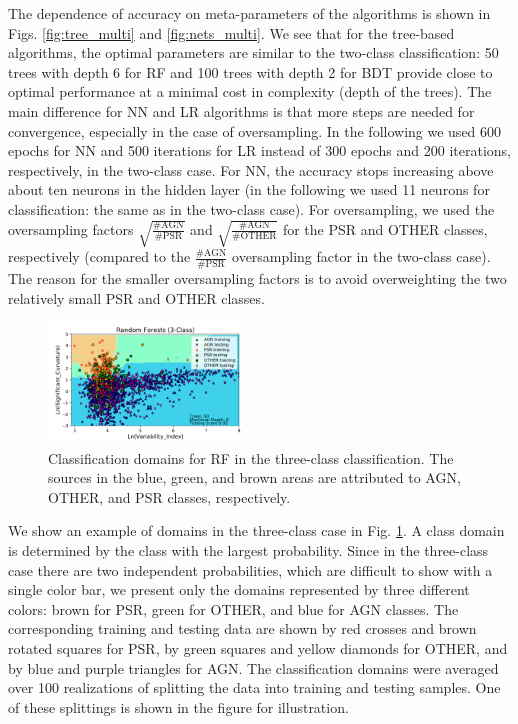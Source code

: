 \documentclass[referee]{aa} %
\begin{document}
The dependence of accuracy on meta-parameters of the algorithms is shown in Figs. \ref{fig:tree_multi} and \ref{fig:nets_multi}.
We see that for the tree-based algorithms, the optimal parameters are similar to the two-class classification: 50 trees with depth 6 for RF and 100 trees with depth 2 for BDT 
provide close to optimal performance at a minimal cost in complexity (depth of the trees).
The main difference for NN and LR algorithms is that more steps are needed for convergence, especially in the case of oversampling. 
In the following we used 600 epochs for NN and 500 iterations for LR instead of 300 epochs and 200 iterations, respectively, in the two-class case.
For NN, the accuracy stops increasing above about ten neurons in the hidden layer (in the following we used 11 neurons for classification: the same as in the two-class case).
For oversampling, we used the oversampling factors $\sqrt{\frac{\text{\# AGN}}{\text{\# PSR}}}$ and $\sqrt{\frac{\text{\# AGN}}{\text{\# OTHER}}}$ for the PSR and OTHER classes, respectively (compared to the $\frac{\text{\# AGN}}{\text{\# PSR}}$ oversampling factor in the two-class case).
The reason for the smaller oversampling factors is to avoid overweighting the two relatively small PSR and OTHER classes.

\begin{figure}[h]
\centering
\includegraphics[width=0.46\textwidth]{plots/classification_domains/rf_50_6_3class.pdf}
\caption{Classification domains for RF in the three-class classification.
The sources in the blue, green, and brown areas are attributed to AGN, OTHER, and PSR classes, respectively.
}
\label{fig:RF_domains_3class}
\end{figure}

We show an example of domains in the three-class case in Fig. \ref{fig:RF_domains_3class}.
A class domain is determined by the class with the largest probability.
Since in the three-class case there are two independent probabilities, which are difficult to show with a single color bar,
we present only the domains represented by three different colors: brown for PSR, green for OTHER, and blue for AGN classes.
The corresponding training and testing data are shown by red crosses and brown rotated squares for PSR, by green squares and yellow diamonds for OTHER,
and by blue and purple triangles for AGN.
The classification domains were averaged over 100 realizations of splitting the data into training and testing samples.
One of these splittings is shown in the figure for illustration.
\end{document}
